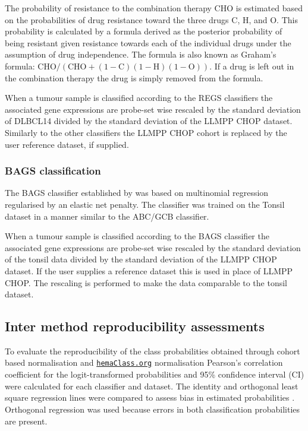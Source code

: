 \documentclass{article}
\newcommand{\hemaClass}{\href{http://hemaClass.org}{\texttt{hemaClass.org}}}
\begin{document}
The probability of resistance to the combination therapy CHO is estimated based on the probabilities of drug resistance toward the three drugs C, H, and O.
This probability is calculated by a formula derived as the posterior probability of being resistant given resistance towards each of the individual drugs under the assumption of drug independence.
The formula is also known as Graham's formula: $\mbox{CHO}/(\mbox{CHO}+(1-\mbox{C})(1-\mbox{H})(1-\mbox{O}))$.
If a drug is left out in the combination therapy the drug is simply removed from the formula.

When a tumour sample is classified according to the REGS classifiers the associated gene expressions are probe-set wise rescaled by the standard deviation of DLBCL14 divided by the standard deviation of the LLMPP CHOP dataset.
Similarly to the other classifiers the LLMPP CHOP cohort is replaced by the user reference dataset, if supplied.


\subsubsection{BAGS classification}
The BAGS classifier established by \citet{Dybkaer2013} was based on multinomial regression regularised by an elastic net penalty.
The classifier was trained on the Tonsil dataset in a manner similar to the ABC/GCB classifier.

When a tumour sample is classified according to the BAGS classifier the associated gene expressions are probe-set wise rescaled by the standard deviation of the tonsil data divided by the standard deviation of the LLMPP CHOP dataset.
If the user supplies a reference dataset this is used in place of LLMPP CHOP.
The rescaling is performed to make the data comparable to the tonsil dataset.


\subsection{Inter method reproducibility assessments}
To evaluate the reproducibility of the class probabilities obtained through cohort based normalisation and \hemaClass{} normalisation Pearson's correlation coefficient for the logit-transformed probabilities and 95\% confidence interval (CI) were calculated for each classifier and dataset.
The identity and orthogonal least square regression lines were compared to assess bias in estimated probabilities \citep{CHEN1989}.
Orthogonal regression was used because errors in both classification probabilities are present.
\end{document}
